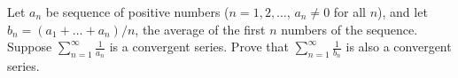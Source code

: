 Let $a_n$ be sequence of positive numbers ($n = 1, 2, \dots$, $a_n \ne 0$ for
all $n$), and let $b_n = (a_1 + \dots + a_n)/n$, the average of the first $n$
numbers of the sequence. Suppose $\displaystyle{\sum_{n=1}^{\infty}
\frac{1}{a_n}}$ is a convergent series. Prove that
$\displaystyle{\sum_{n=1}^{\infty} \frac{1}{b_n}}$ is also a convergent series.
